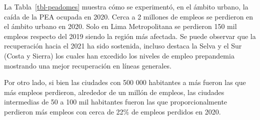 \documentclass[
  letterpaper,
  12pt,
  oneside,
  spanish,
  doublespacing,
  headsepline,
  parskip]{MastersDoctoralThesis}
\begin{document}
La Tabla~\ref{tbl-peadomes} muestra cómo se experimentó, en el ámbito
urbano, la caída de la PEA ocupada en 2020. Cerca a 2 millones de
empleos se perdieron en el ámbito urbano en 2020. Solo en Lima
Metropolitana se perdieron 150 mil empleos respecto del 2019 siendo la
región más afectada. Se puede observar que la recuperación hacia el 2021
ha sido sostenida, incluso destaca la Selva y el Sur (Costa y Sierra)
los cuales han excedido los niveles de empleo prepandemia mostrando una
mejor recuperación en líneas generales.

Por otro lado, si bien las ciudades con 500 000 habitantes a más fueron
las que más empleos perdieron, alrededor de un millón de empleos, las
ciudades intermedias de 50 a 100 mil habitantes fueron las que
proporcionalmente perdieron más empleos con cerca de 22\% de empleos
perdidos en 2020.
\end{document}
